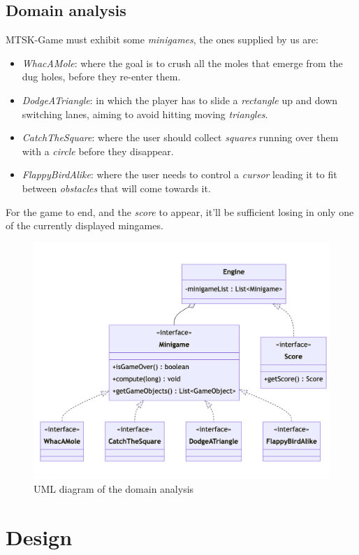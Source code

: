 \documentclass[a4paper,12pt]{report}
\begin{document}
\section{Domain analysis}

MTSK-Game must exhibit some \textit{minigames}, the ones supplied by us are:
\begin{itemize} 
	\item \textit{WhacAMole}: where the goal is to crush all the moles that emerge from the dug holes, before they re-enter them.
	\item \textit{DodgeATriangle}: in which the player has to slide a \textit{rectangle} up and down switching lanes, aiming to avoid hitting moving \textit{triangles}.
	\item \textit{CatchTheSquare}: where the user should collect \textit{squares} running over them with a \textit{circle} before they disappear.
	\item \textit{FlappyBirdAlike}: where the user needs to control a \textit{cursor} leading it to fit between \textit{obstacles} that will come towards it.
\end{itemize}
For the game to end, and the \textit{score} to appear, it'll be sufficient losing in only one of the currently displayed mingames.


\begin{figure}[ht]
	\centering{}
	\includegraphics[width=\textwidth]{domain.png}
	\caption{UML diagram of the domain analysis}
\end{figure}

\chapter{Design}
\end{document}
